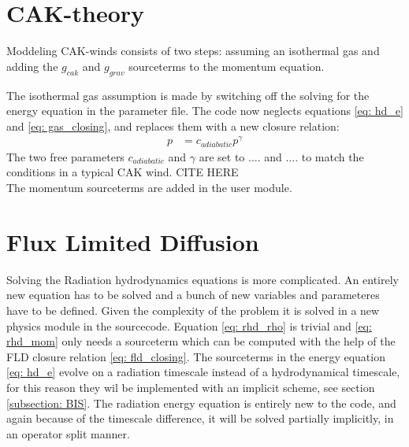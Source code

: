 \section{CAK-theory}
Moddeling CAK-winds consists of two steps: assuming an isothermal gas and adding the $g_{cak}$ and $g_{grav}$ sourceterms to the momentum equation.

The isothermal gas assumption is made by switching off the solving for the energy equation in the parameter file. The code now neglects equations \eqref{eq: hd_e} and \eqref{eq: gas_closing}, and replaces them with a new closure relation:
\begin{align}
 p &= c_{adiabatic} p^\gamma
\end{align}
The two free parameters $c_{adiabatic}$ and $\gamma$ are set to .... and .... to match the conditions in a typical CAK wind. CITE HERE\\

The momentum sourceterms are added in the user module.


\section{Flux Limited Diffusion}
Solving the Radiation hydrodynamics equations is more complicated. An entirely new equation has to be solved and a bunch of new variables and parameteres have to be defined. Given the complexity of the problem it is solved in a new physics module in the sourcecode. Equation \eqref{eq: rhd_rho} is trivial and \eqref{eq: rhd_mom} only needs a sourceterm which can be computed with the help of the FLD closure relation \eqref{eq: fld_closing}. The sourceterms in the energy equation \eqref{eq: hd_e} evolve on a radiation timescale instead of a hydrodynamical timescale, for this reason they wil be implemented with an implicit scheme, see section \ref{subsection: BIS}. The radiation energy equation is entirely new to the code, and again because of the timescale difference, it will be solved partially implicitly, in an operator split manner. \\

